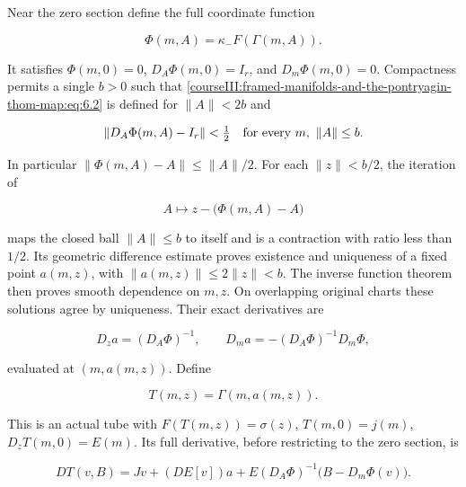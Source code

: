Near the zero section define the full coordinate function

\begin{equation}
\Phi(m,A)=\kappa_-F(\Gamma(m,A)).
 \label{courseIII:framed-manifolds-and-the-pontryagin-thom-map:eq:6.2}
\end{equation}

It satisfies \(\Phi(m,0)=0\), \(D_A\Phi(m,0)=I_r\), and \(D_m\Phi(m,0)=0\). Compactness permits a single \(b>0\) such that \eqref{courseIII:framed-manifolds-and-the-pontryagin-thom-map:eq:6.2} is defined for \(\|A\|<2b\) and

\begin{equation}
\|D_A\Phi(m,A)-I_r\|<\tfrac12
       \quad\hbox{for every }m,\ \|A\|\leq b.
 \label{courseIII:framed-manifolds-and-the-pontryagin-thom-map:eq:6.3}
\end{equation}

In particular \(\|\Phi(m,A)-A\|\leq\|A\|/2\). For each \(\|z\|<b/2\), the iteration of

\begin{equation}
A\longmapsto z-\bigl(\Phi(m,A)-A\bigr)
 \label{courseIII:framed-manifolds-and-the-pontryagin-thom-map:eq:6.4}
\end{equation}

maps the closed ball \(\|A\|\leq b\) to itself and is a contraction with ratio less than \(1/2\). Its geometric difference estimate proves existence and uniqueness of a fixed point \(a(m,z)\), with \(\|a(m,z)\|\leq2\|z\|<b\). The inverse function theorem then proves smooth dependence on \(m,z\). On overlapping original charts these solutions agree by uniqueness. Their exact derivatives are

\begin{equation}
D_za=(D_A\Phi)^{-1},\qquad
 D_ma=-(D_A\Phi)^{-1}D_m\Phi,
 \label{courseIII:framed-manifolds-and-the-pontryagin-thom-map:eq:6.5}
\end{equation}

evaluated at \((m,a(m,z))\). Define

\begin{equation}
T(m,z)=\Gamma(m,a(m,z)).
 \label{courseIII:framed-manifolds-and-the-pontryagin-thom-map:eq:6.6}
\end{equation}

This is an actual tube with \(F(T(m,z))=\sigma(z)\), \(T(m,0)=j(m)\), \(D_zT(m,0)=E(m)\). Its full derivative, before restricting to the zero section, is

\begin{equation}
DT(v,B)=Jv+(DE[v])a+
             E(D_A\Phi)^{-1}\bigl(B-D_m\Phi(v)\bigr).
 \label{courseIII:framed-manifolds-and-the-pontryagin-thom-map:eq:6.7}
\end{equation}

